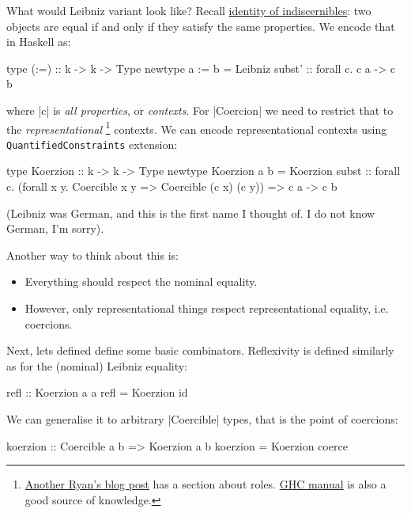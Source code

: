 What would Leibniz variant look like?
Recall \href{https://en.wikipedia.org/wiki/Identity_of_indiscernibles}{identity
of indiscernibles}: two objects are equal if and only if they satisfy the same
properties. We encode that in Haskell as:

\begin{code}
type (:=) :: k -> k -> Type
newtype a := b = Leibniz { subst' :: forall c. c a -> c b }
\end{code}

where |c| is \emph{all properties}, or \emph{contexts}.
For |Coercion| we need to restrict that to the \emph{representational}%
\footnote{\href{https://ryanglscott.github.io/2018/03/04/how-quantifiedconstraints-can-let-us-put-join-back-in-monad/}{Another Ryan's blog post} has a section about roles. \href{https://downloads.haskell.org/ghc/9.0.1/docs/html/users_guide/exts/roles.html}{GHC manual} is also a good source of knowledge.}
contexts.
We can encode representational contexts
using \texttt{QuantifiedConstraints} extension:

\begin{code}
type Koerzion :: k -> k -> Type
newtype Koerzion a b = Koerzion
  { subst :: forall c. (forall x y. Coercible x y => Coercible (c x) (c y))
          => c a -> c b
  }
\end{code}

(Leibniz was German, and this is the first name I thought of. I do not know German, I'm sorry).

Another way to think about this is:
\begin{itemize}
\item Everything should respect the nominal equality.
\item However, only representational things respect representational equality, i.e. coercions.
\end{itemize}

Next, lets defined define some basic combinators.
Reflexivity is defined similarly as for the (nominal) Leibniz equality:

\begin{code}
refl :: Koerzion a a
refl = Koerzion id
\end{code}

We can generalise it to arbitrary |Coercible| types, that is the point of coercions:

\begin{code}
koerzion :: Coercible a b => Koerzion a b
koerzion = Koerzion coerce
\end{code}

